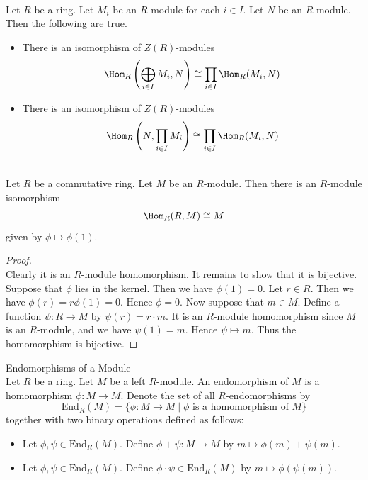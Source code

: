 \documentclass[a4paper]{article}
\begin{document}
\begin{prp}{}{}\\
Let $R$ be a ring. Let $M_i$ be an $R$-module for each $i\in I$. Let $N$ be an $R$-module. Then the following are true. 
\begin{itemize}
\item There is an isomorphism of $Z(R)$-modules $$\Hom_R\left(\bigoplus_{i\in I}M_i,N\right)\cong\prod_{i\in I}\Hom_R(M_i,N)$$
\item There is an isomorphism of $Z(R)$-modules $$\Hom_R\left(N,\prod_{i\in I}M_i\right)\cong\prod_{i\in I}\Hom_R(M_i,N)$$
\end{itemize}
\end{prp}

\begin{prp}{}{}\\
Let $R$ be a commutative ring. Let $M$ be an $R$-module. Then there is an $R$-module isomorphism $$\Hom_R(R,M)\cong M$$ given by $\phi\mapsto\phi(1)$. 
\begin{proof}\\
Clearly it is an $R$-module homomorphism. It remains to show that it is bijective. Suppose that $\phi$ lies in the kernel. Then we have $\phi(1)=0$. Let $r\in R$. Then we have $\phi(r)=r\phi(1)=0$. Hence $\phi=0$. Now suppose that $m\in M$. Define a function $\psi:R\to M$ by $\psi(r)=r\cdot m$. It is an $R$-module homomorphism since $M$ is an $R$-module, and we have $\psi(1)=m$. Hence $\psi\mapsto m$. Thus the homomorphism is bijective. 
\end{proof}
\end{prp}

\begin{defn}{Endomorphisms of a Module}{}\\
Let $R$ be a ring. Let $M$ be a left $R$-module. An endomorphism of $M$ is a homomorphism $\phi:M\to M$. Denote the set of all $R$-endomorphisms by $$\text{End}_R(M)=\{\phi:M\to M\;|\;\phi\text{ is a homomorphism of }M\}$$ together with two binary operations defined as follows: 
\begin{itemize}
\item Let $\phi,\psi\in\text{End}_R(M)$. Define $\phi+\psi:M\to M$ by $m\mapsto\phi(m)+\psi(m)$. 
\item Let $\phi,\psi\in\text{End}_R(M)$. Define $\phi\cdot\psi\in\text{End}_R(M)$ by $m\mapsto\phi(\psi(m))$. 
\end{itemize}
\end{defn}
\end{document}
